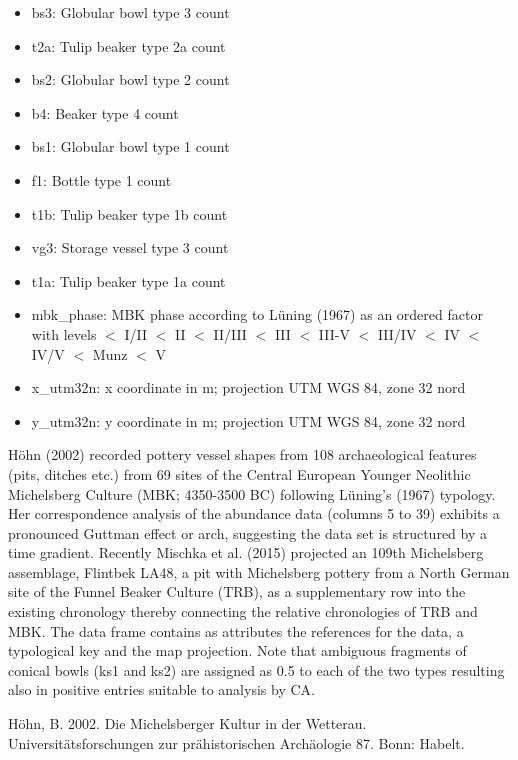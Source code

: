 \documentclass[a3, ruledsections, 8pt]{sciposter}
\begin{document}
\begin{multicols}{3}
\begin{small}
\begin{itemize}
\item bs3: Globular bowl type 3 count
\item t2a: Tulip beaker type 2a count
\item bs2: Globular bowl type 2 count
\item b4: Beaker type 4 count
\item bs1: Globular bowl type 1 count
\item f1: Bottle type 1 count
\item t1b: Tulip beaker type 1b count
\item vg3: Storage vessel type 3 count
\item t1a: Tulip beaker type 1a count
\item mbk\_phase: MBK phase according to Lüning (1967) as an ordered factor with levels $<$ I/II $<$ II $<$ II/III $<$ III $<$ III-V $<$ III/IV $<$ IV $<$ IV/V $<$ Munz $<$ V
\item x\_utm32n: x coordinate in m; projection UTM WGS 84, zone 32 nord
\item y\_utm32n: y coordinate in m; projection UTM WGS 84, zone 32 nord
\end{itemize}

\end{small}

\end{multicols}

\medskip

Höhn (2002) recorded pottery vessel shapes from 108 archaeological features (pits, ditches etc.) from 69 sites of the Central European Younger Neolithic Michelsberg Culture (MBK; 4350-3500 BC) following Lüning's (1967) typology. Her correspondence analysis of the abundance data (columns 5 to 39) exhibits a pronounced Guttman effect or arch, suggesting the data set is structured by a time gradient. Recently Mischka et al. (2015) projected an 109th Michelsberg assemblage, Flintbek LA48, a pit with Michelsberg pottery from a North German site of the Funnel Beaker Culture (TRB), as a supplementary row into the existing chronology thereby connecting the relative chronologies of TRB and MBK. The data frame contains as attributes the references for the data, a typological key and the map projection. Note that ambiguous fragments of conical bowls (ks1 and ks2) are assigned as 0.5 to each of the two types resulting also in positive entries suitable to analysis by CA.

\medskip

Höhn, B. 2002. Die Michelsberger Kultur in der Wetterau. Universitätsforschungen zur prähistorischen Archäologie 87. Bonn: Habelt.
\end{document}
